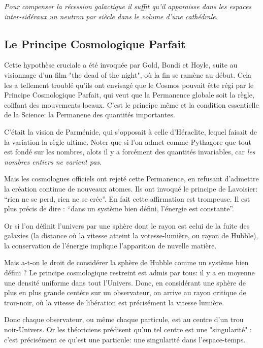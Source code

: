 \documentclass[a4paper,12pt]{article}
\begin{document}
\textit{Pour compenser la récession galactique il suffit qu'il apparaisse dans les espaces inter-sidéraux un neutron par siècle dans le volume d'une cathédrale}.

\subsection{Le Principe Cosmologique Parfait}

Cette hypothèse cruciale a été invoquée par Gold, Bondi et Hoyle, suite au visionnage d'un film "the dead of the night", où la fin se ramène au début. Cela les a tellement troublé qu'ils ont envisagé que le Cosmos pouvait êtte régi par le  Principe Cosmologique Parfait, qui veut que la Permanence globale soit la règle, coiffant des mouvements locaux. C'est le principe même et la condition essentielle de la Science: la Permanene des quantités importantes.

C'était la vision de Parménide, qui s'opposait à celle d'Héraclite, lequel faisait de la variation la règle ultime. Noter que si l'on admet comme Pythagore que tout est fondé sur les nombres, alots il y a forcément des quantités invariables, car \textit{les nombres entiers ne varient pas.}

Mais les cosmologues officiels ont rejeté cette Permanence, en refusant d'admettre la création continue de nouveaux atomes. Ils ont invoqué le principe de Lavoisier: ``rien ne se perd, rien ne se crée''. En fait cette affirmation est trompeuse. Il est plus précis de dire : ``dans un système bien défini, l'énergie est constante''. 

Or si l'on définit l'univers par une sphère dont le rayon est celui de la fuite des galaxies (la distance où la vitesse atteint la votesse-lumière, ou rayon de Hubble), la conservation de l'énergie implique l'apparition de nuvelle matière. 

Mais a-t-on le droit de considérer la sphère de Hubble comme un système bien défini ? Le principe cosmologique restreint est admis par tous: il y a en moyenne une densité uniforme dans tout l'Univers. Donc, en considérant une sphère de plus en plus grande centére sur un observateur, on arrive au rayon critique de trou-noir, où la vitesse de libération est précisément la vitesse lumière. 

Donc chaque observateur, ou même chaque particule, est au centre d'un trou noir-Univers. Or les théoriciens prédisent qu'un tel centre est une "singularité" : c'est précisément ce qu'est une particule: une singularité dans l'espace-temps.
\end{document}
